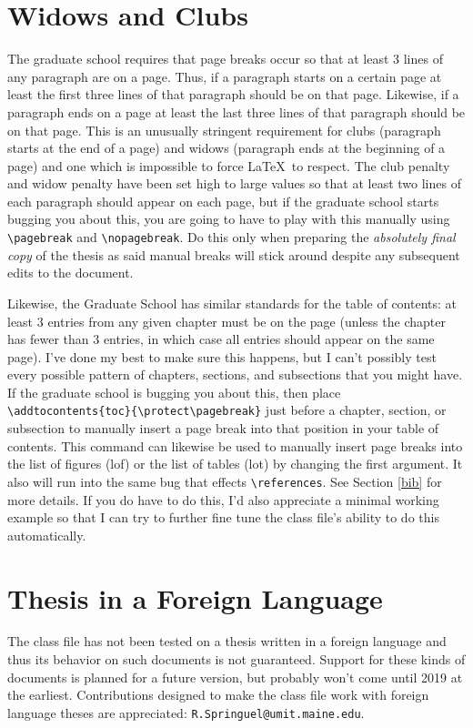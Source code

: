 \section{Widows and Clubs}
The graduate school requires that page breaks occur so that at least 3 lines of any paragraph are on a page.  Thus, if a paragraph starts on a certain page at least the first three lines of that paragraph should be on that page.  Likewise, if a paragraph ends on a page at least the last three lines of that paragraph should be on that page.  This is an unusually stringent requirement for clubs (paragraph starts at the end of a page) and widows (paragraph ends at the beginning of a page) and one which is impossible to force \LaTeX\ to respect.  The club penalty and widow penalty have been set high to large values so that at least two lines of each paragraph should appear on each page, but if the graduate school starts bugging you about this, you are going to have to play with this manually using \verb=\pagebreak= and \verb=\nopagebreak=.  Do this only when preparing the \textit{absolutely final copy} of the thesis as said manual breaks will stick around despite any subsequent edits to the document.

Likewise, the Graduate School has similar standards for the table of contents: at least 3 entries from any given chapter must be on the page (unless the chapter has fewer than 3 entries, in which case all entries should appear on the same page).  I've done my best to make sure this happens, but I can't possibly test every possible pattern of chapters, sections, and subsections that you might have.  If the graduate school is bugging you about this, then place \verb=\addtocontents{toc}{\protect\pagebreak}= just before a chapter, section, or subsection to manually insert a page break into that position in your table of contents.  This command can likewise be used to manually insert page breaks into the list of figures (lof) or the list of tables (lot) by changing the first argument.  It also will run into the same bug that effects \verb=\references=.  See Section \ref{bib} for more details.  If you do have to do this, I'd also appreciate a minimal working example so that I can try to further fine tune the class file's ability to do this automatically.

\section{Thesis in a Foreign Language}
The class file has not been tested on a thesis written in a foreign language and thus its behavior on such documents is not guaranteed.  Support for these kinds of documents is planned for a future version, but probably won't come until 2019 at the earliest.  Contributions designed to make the class file work with foreign language theses are appreciated: \verb=R.Springuel@umit.maine.edu=.

